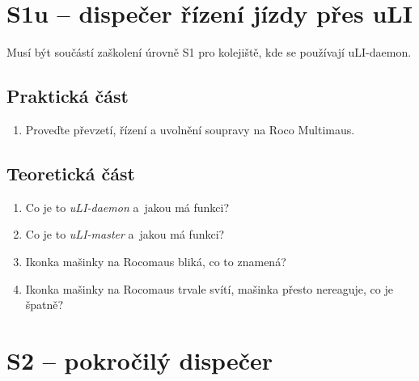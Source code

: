 \documentclass[12pt,a4paper]{article}
\begin{document}
\newpage
\section{S1u – dispečer řízení jízdy přes uLI}

Musí být součástí zaškolení úrovně S1 pro kolejiště, kde se používají
uLI-daemon.

\subsection{Praktická část}

\begin{enumerate}[leftmargin=*]
\item Proveďte převzetí, řízení a uvolnění soupravy na Roco Multimaus.
\end{enumerate}

\subsection{Teoretická část}

\begin{enumerate}[leftmargin=*]

\item Co je to \textit{uLI-daemon} a~jakou má funkci?

\item Co je to \textit{uLI-master} a~jakou má funkci?

\item Ikonka mašinky na Rocomaus bliká, co to znamená?

\item Ikonka mašinky na Rocomaus trvale svítí, mašinka přesto nereaguje,
co je špatně?

\end{enumerate}


\newpage
\section{S2 – pokročilý dispečer}
\end{document}
